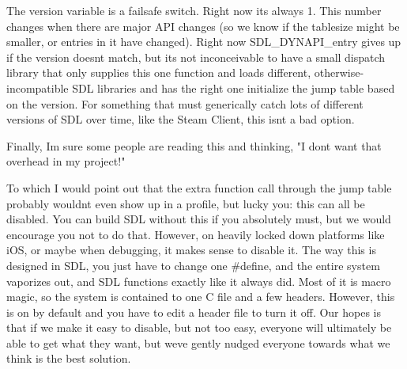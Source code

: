 The version variable is a failsafe switch. Right now it\textquotesingle{}s always 1. This number changes when there are major API changes (so we know if the tablesize might be smaller, or entries in it have changed). Right now SDL\+\_\+\+DYNAPI\+\_\+entry gives up if the version doesn\textquotesingle{}t match, but it\textquotesingle{}s not inconceivable to have a small dispatch library that only supplies this one function and loads different, otherwise-\/incompatible SDL libraries and has the right one initialize the jump table based on the version. For something that must generically catch lots of different versions of SDL over time, like the Steam Client, this isn\textquotesingle{}t a bad option.

Finally, I\textquotesingle{}m sure some people are reading this and thinking, "{}\+I don\textquotesingle{}t want that overhead in my project!"{}

To which I would point out that the extra function call through the jump table probably wouldn\textquotesingle{}t even show up in a profile, but lucky you:\+ this can all be disabled. You can build SDL without this if you absolutely must, but we would encourage you not to do that. However, on heavily locked down platforms like i\+OS, or maybe when debugging, it makes sense to disable it. The way this is designed in SDL, you just have to change one \+\#define, and the entire system vaporizes out, and SDL functions exactly like it always did. Most of it is macro magic, so the system is contained to one C file and a few headers. However, this is on by default and you have to edit a header file to turn it off. Our hopes is that if we make it easy to disable, but not too easy, everyone will ultimately be able to get what they want, but we\textquotesingle{}ve gently nudged everyone towards what we think is the best solution. 